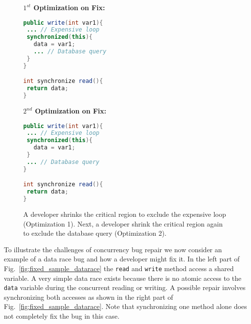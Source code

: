 \begin{figure}[t!]
\begin{minipage}{5cm}
\footnotesize{\textbf{$1^{st}$ Optimization on Fix:}}
\begin{lstlisting}[language=Java, morekeywords={synchronize}]
public write(int var1){
 ... // Expensive loop
 synchronized(this){
   data = var1;
   ... // Database query
 }
}

int synchronize read(){
 return data;
}
\end{lstlisting}
\end{minipage}\hfill
\begin{minipage}{5cm}
\footnotesize{\textbf{$2^{nd}$ Optimization on Fix:}}
\begin{lstlisting}[language=Java, morekeywords={synchronize}]
public write(int var1){
 ... // Expensive loop
 synchronized(this){
   data = var1;
 }
 ... // Database query
}

int synchronize read(){
 return data;
}
\end{lstlisting}
\end{minipage}
\caption{A developer shrinks the critical region to exclude the expensive loop (Optimization 1).
Next, a developer shrink the critical region again to exclude the database query (Optimization 2).}
\label{fig:optimized_sample_datarace}
\end{figure}


To illustrate the challenges of concurrency bug repair we now consider an example of a data race bug and how a developer might fix it. In the left part of Fig.~\ref{fig:fixed_sample_datarace} the
\texttt{read} and \texttt{write} method access a shared variable. A very simple
data race exists because there is no atomic access to the \texttt{data}
variable during the concurrent reading or writing.
A possible repair involves synchronizing both accesses as shown in the right part of
Fig.~\ref{fig:fixed_sample_datarace}. Note that synchronizing one method alone does not
completely fix the bug in this case.


